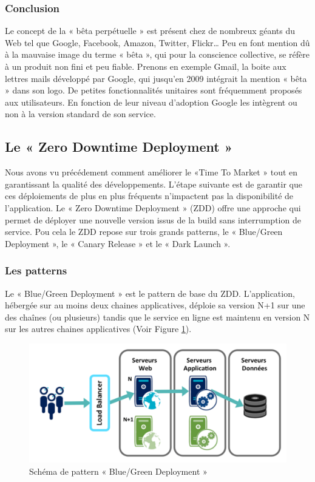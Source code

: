 \documentclass{report}
\begin{document}
        \subsubsection{Conclusion}
        Le concept de la « bêta perpétuelle » est présent chez de nombreux géants du Web tel que Google, Facebook, Amazon, Twitter, Flickr… Peu en font mention dû à la mauvaise image du terme « bêta », qui pour la conscience collective, se réfère à un produit non fini et peu fiable. Prenons en exemple Gmail, la boite aux lettres mails développé par Google, qui jusqu’en 2009 intégrait la mention « bêta » dans son logo. De petites fonctionnalités unitaires sont fréquemment proposés aux utilisateurs. En fonction de leur niveau d’adoption Google les intègrent ou non à la version standard de son service.

        \subsection{Le « Zero Downtime Deployment »}
        Nous avons vu précédement comment améliorer le «Time To Market » tout en garantissant la qualité des développements. L'étape suivante est de garantir que ces déploiements de plus en plus fréquents n'impactent pas la disponibilité de l'application. Le « Zero Downtime Deployment » (ZDD) offre une approche qui permet de déployer une nouvelle version issus de la build sans interrumption de service. Pou cela le ZDD repose sur trois grands patterns, le « Blue/Green Deployment », le « Canary Release » et le « Dark Launch ».
          \subsubsection{Les patterns}
          Le « Blue/Green Deployment » est le pattern de base du ZDD. L’application, hébergée sur au moins deux chaines applicatives, déploie sa version N+1 sur une des chaînes (ou plusieurs) tandis que le service en ligne est maintenu en version N sur les autres chaines applicatives (Voir Figure \ref{BlueGreen}).\\

          \begin{figure}
            \begin{center}
              \includegraphics[scale=0.7]{images/BlueGreenDeployment.png}
            \end{center}
            \caption{Schéma de pattern « Blue/Green Deployment »}
            \label{BlueGreen}
          \end{figure}
\end{document}
